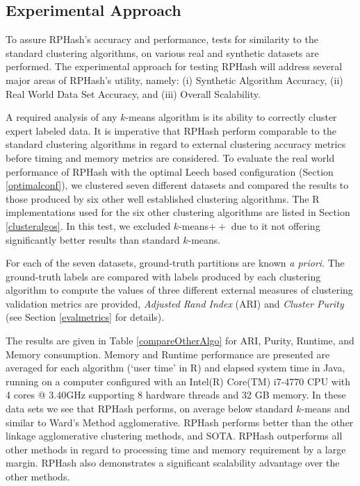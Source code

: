 \subsection{Experimental Approach}\label{experiments}
To assure \textsf{RPHash}'s accuracy and performance, tests for similarity to the standard clustering
algorithms, on various real and synthetic datasets are performed.  The experimental approach for
testing \textsf{RPHash} will address several major areas of \textsf{RPHash}'s utility, namely: (i)
Synthetic Algorithm Accuracy, (ii) Real World Data Set Accuracy, and (iii) Overall Scalability.

A required analysis of any $k$-means algorithm is its ability to correctly cluster expert labeled
data.  It is imperative that \textsf{RPHash} perform comparable to the standard clustering algorithms
in regard to external clustering accuracy metrics before timing and memory metrics are considered.
To evaluate the real world performance of \textsf{RPHash} with the optimal Leech based configuration
(Section \ref{optimalconf}), we clustered seven different datasets and compared the results to those
produced by six other well established clustering algorithms.  The R implementations used for the
six other clustering algorithms are listed in Section \ref{clusteralgos}.  In this test, we excluded
$k$-means$++$ due to it not offering significantly better results than standard $k$-means.

For each of the seven datasets, ground-truth partitions are known \emph{a priori}.  The ground-truth
labels are compared with labels produced by each clustering algorithm to compute the values of three
different external measures of clustering validation metrics are provided, \emph{Adjusted Rand
  Index} (ARI) and \emph{Cluster Purity} (see Section \ref{evalmetrics} for details).

The results are given in Table \ref{compareOtherAlgo} for ARI, Purity, Runtime, and Memory consumption.
Memory and Runtime performance are presented are averaged for each algorithm (`user time' in R) and
elapsed system time in Java, running on a computer configured with an Intel(R) Core(TM) i7-4770 CPU
with 4 cores @ 3.40GHz supporting 8 hardware threads and 32 GB memory. In these data sets we see that
\textsf{RPHash} performs, on average below standard $k$-means and similar to Ward's Method agglomerative. \textsf{RPHash} performs
better than the other linkage agglomerative clustering methods, and SOTA. \textsf{RPHash} outperforms
all other methods in regard to processing time and memory requirement by a large margin.  \textsf{RPHash} also
demonstrates a significant scalability advantage over the other methods.

